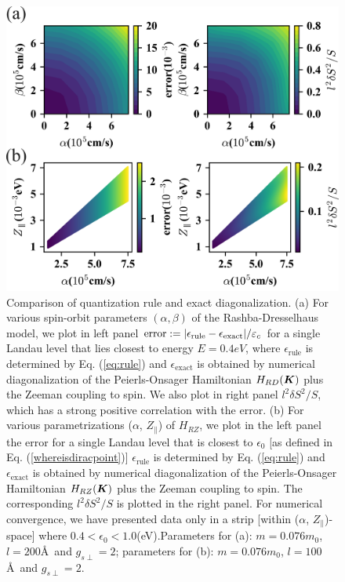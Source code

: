 \documentclass[aps, showpacs, twocolumn, notitlepage, superscriptaddress]{revtex4-1}
\begin{document}
\begin{figure}
\includegraphics[width=1.0\columnwidth]{error.png}
\caption{{Comparison of quantization rule and exact diagonalization. (a) For various spin-orbit parameters $(\alpha,\beta)$ of the Rashba-Dresselhaus model, we plot in left panel $\text{error}:=|\epsilon_\text{rule}-\epsilon_\text{exact}|/\varepsilon_c$ for a single Landau level that lies closest to energy $E=0.4eV$, where $\epsilon_\text{rule}$ is determined by Eq. (\ref{eq:rule}) and $\epsilon_{\text{exact}}$ is obtained by numerical diagonalization of the Peierls-Onsager Hamiltonian $H_{RD}(\boldsymbol{K})$ plus the Zeeman coupling to spin. We also plot in right panel $l^2\delta S^2/S$, which has a strong positive correlation with the error. (b) For various parametrizations ($\alpha$, $Z_\parallel$) of $H_{RZ}$, we plot in the left panel the error for a single Landau level that is closest to $\epsilon_0$ [as defined in Eq. (\ref{whereisdiracpoint})] $\epsilon_\text{rule}$ is determined by Eq. (\ref{eq:rule}) and $\epsilon_{\text{exact}}$ is obtained by numerical diagonalization of the Peierls-Onsager Hamiltonian $H_{RZ}(\boldsymbol{K})$ plus the Zeeman coupling to spin. The corresponding $l^2 \delta S^2/S$ is plotted in the right panel. For numerical convergence\cite{RZfignote}, we have presented data only in a strip [within ($\alpha$, $Z_\parallel$)-space] where $0.4{<}\epsilon_0{<}1.0$(eV).Parameters for (a): $m=0.076m_0$, $l=200$\AA~and $g_{s\perp}=2$; parameters for (b): $m=0.076m_0$, $l=100$\AA~and $g_{s\perp}=2$.}\label{fig:error}}
\end{figure}
\end{document}
